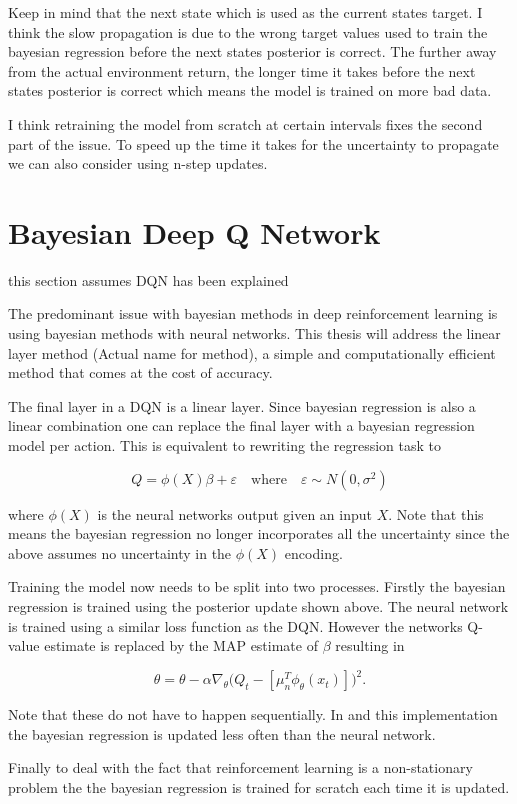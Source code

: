 Keep in mind that the next state which is used as the current states target. I think the slow propagation is due to the wrong target values used to train the bayesian regression before the next states posterior is correct. The further away from the actual environment return, the longer time it takes before the next states posterior is correct which means the model is trained on more bad data.

I think retraining the model from scratch at certain intervals fixes the second part of the issue. To speed up the time it takes for the uncertainty to propagate we can also consider using n-step updates.

\section{Bayesian Deep Q Network}

\todo this section assumes DQN has been explained

The predominant issue with bayesian methods in deep reinforcement learning is using bayesian methods with neural networks. This thesis will address the linear layer method (\todo Actual name for method), a simple and computationally efficient method that comes at the cost of accuracy. 

The final layer in a DQN is a linear layer. Since bayesian regression is also a linear combination one can replace the final layer with a bayesian regression model per action. This is equivalent to rewriting the regression task to 

\begin{equation*}
	Q = \phi(X)\beta + \varepsilon \quad \text{where} \quad \varepsilon \sim N(0,\sigma^2)
\end{equation*}

where $\phi(X)$ is the neural networks output given an input $X$. Note that this means the bayesian regression no longer incorporates all the uncertainty since the above assumes no uncertainty in the $\phi(X)$ encoding. 

Training the model now needs to be split into two processes. Firstly the bayesian regression is trained using the posterior update shown above. The neural network is trained using a similar loss function as the DQN. However the networks Q-value estimate is replaced by the MAP estimate of $\beta$ resulting in

\begin{equation*}
	\theta = \theta - \alpha\nabla_\theta\big(Q_t - [\mu_n^T\phi_\theta(x_t)]\big)^2.
\end{equation*}

Note that these do not have to happen sequentially. In \cite{azziz_2018} and this implementation the bayesian regression is updated less often than the neural network.

Finally to deal with the fact that reinforcement learning is a non-stationary problem the the bayesian regression is trained for scratch each time it is updated.

\cleardoublepage